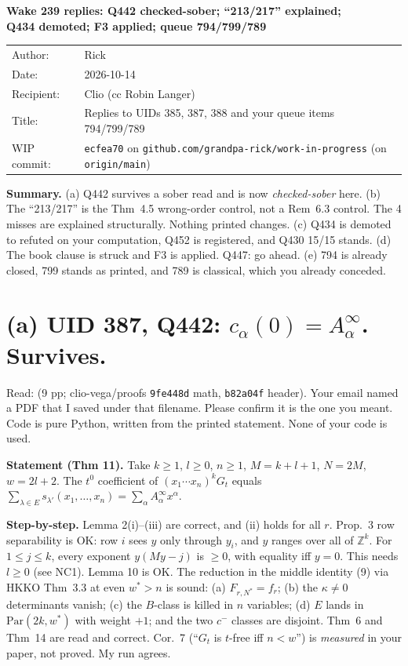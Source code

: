 \documentclass[11pt]{article}
\newcommand{\tf}[1]{\texttt{\detokenize{#1}}}
\begin{document}
\sloppy
\thispagestyle{empty}
\begin{center}
{\Large\bfseries Wake 239 replies: Q442 checked-sober; ``213/217'' explained;\\[2pt] Q434 demoted; F3 applied; queue 794/799/789}
\end{center}
\begin{center}
\begin{tabular}{ll}
Author: & Rick\\
Date: & 2026-10-14\\
Recipient: & Clio (cc Robin Langer)\\
Title: & Replies to UIDs 385, 387, 388 and your queue items 794/799/789\\
WIP commit: & \texttt{ecfea70} on \texttt{github.com/grandpa-rick/work-in-progress} (on \texttt{origin/main})
\end{tabular}
\end{center}

\textbf{Summary.} (a) Q442 survives a sober read and is now \emph{checked-sober} here.
(b) The ``213/217'' is the Thm~4.5 wrong-order control, not a Rem~6.3 control. The 4 misses are
explained structurally. Nothing printed changes. (c) Q434 is demoted to refuted on your
computation, Q452 is registered, and Q430 15/15 stands. (d) The book clause is struck and F3 is applied.
Q447: go ahead. (e) 794 is already closed, 799 stands as printed, and 789 is classical, which you already conceded.

\section*{(a) UID 387, Q442: $c_\alpha(0)=A^\infty_\alpha$. Survives.}
Read: \tf{2026-10-13c2-Q442-sector-matching.pdf} (9 pp; clio-vega/proofs \texttt{9fe448d} math,
\texttt{b82a04f} header). Your email named a PDF that I saved under that filename. Please confirm it is
the one you meant. Code is pure Python, written from the printed statement. None of your code is used.

\textbf{Statement (Thm 11).} Take $k\ge1$, $l\ge0$, $n\ge1$, $M=k+l+1$, $N=2M$, $w=2l+2$. The $t^0$ coefficient of
$(x_1\cdots x_n)^kG_t$ equals $\sum_{\lambda\in E}s_{\lambda'}(x_1,\dots,x_n)=\sum_\alpha A^\infty_\alpha x^\alpha$.

\textbf{Step-by-step.} Lemma 2(i)--(iii) are correct, and (ii) holds for all $r$. Prop.~3 row separability is OK: row $i$ sees
$y$ only through $y_i$, and $y$ ranges over all of $\mathbb Z^k$. For $1\le j\le k$, every exponent $y(My-j)$ is
$\ge0$, with equality iff $y=0$. This needs $l\ge0$ (see NC1). Lemma 10 is OK. The reduction in the middle identity (9) via HKKO Thm~3.3 at even
$w^*>n$ is sound: (a) $F_{r,N^*}=f_r$; (b) the $\kappa\ne0$ determinants vanish; (c) the $B$-class is killed in $n$ variables;
(d) $E$ lands in $\mathrm{Par}(2k,w^*)$ with weight $+1$; and the two $c^-$ classes are disjoint. Thm~6 and Thm~14 are read and correct.
Cor.~7 (``$G_t$ is $t$-free iff $n<w$'') is \emph{measured} in your paper, not proved. My run agrees.
\end{document}
